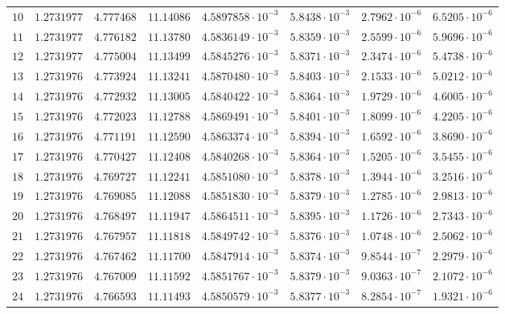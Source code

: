 {\begin{longtable}{@{}rrrrrrrr@{}}
$10$ & $1.2731977$ & $4.777468$ & $11.14086$ & $4.5897858\cdot10^{-3}$ & $5.8438\cdot10^{-3}$ & $2.7962\cdot10^{-6}$ & $6.5205\cdot10^{-6}$\\
$11$ & $1.2731977$ & $4.776182$ & $11.13780$ & $4.5836149\cdot10^{-3}$ & $5.8359\cdot10^{-3}$ & $2.5599\cdot10^{-6}$ & $5.9696\cdot10^{-6}$\\
$12$ & $1.2731977$ & $4.775004$ & $11.13499$ & $4.5845276\cdot10^{-3}$ & $5.8371\cdot10^{-3}$ & $2.3474\cdot10^{-6}$ & $5.4738\cdot10^{-6}$\\
$13$ & $1.2731976$ & $4.773924$ & $11.13241$ & $4.5870480\cdot10^{-3}$ & $5.8403\cdot10^{-3}$ & $2.1533\cdot10^{-6}$ & $5.0212\cdot10^{-6}$\\
$14$ & $1.2731976$ & $4.772932$ & $11.13005$ & $4.5840422\cdot10^{-3}$ & $5.8364\cdot10^{-3}$ & $1.9729\cdot10^{-6}$ & $4.6005\cdot10^{-6}$\\
$15$ & $1.2731976$ & $4.772023$ & $11.12788$ & $4.5869491\cdot10^{-3}$ & $5.8401\cdot10^{-3}$ & $1.8099\cdot10^{-6}$ & $4.2205\cdot10^{-6}$\\
$16$ & $1.2731976$ & $4.771191$ & $11.12590$ & $4.5863374\cdot10^{-3}$ & $5.8394\cdot10^{-3}$ & $1.6592\cdot10^{-6}$ & $3.8690\cdot10^{-6}$\\
$17$ & $1.2731976$ & $4.770427$ & $11.12408$ & $4.5840268\cdot10^{-3}$ & $5.8364\cdot10^{-3}$ & $1.5205\cdot10^{-6}$ & $3.5455\cdot10^{-6}$\\
$18$ & $1.2731976$ & $4.769727$ & $11.12241$ & $4.5851080\cdot10^{-3}$ & $5.8378\cdot10^{-3}$ & $1.3944\cdot10^{-6}$ & $3.2516\cdot10^{-6}$\\
$19$ & $1.2731976$ & $4.769085$ & $11.12088$ & $4.5851830\cdot10^{-3}$ & $5.8379\cdot10^{-3}$ & $1.2785\cdot10^{-6}$ & $2.9813\cdot10^{-6}$\\
$20$ & $1.2731976$ & $4.768497$ & $11.11947$ & $4.5864511\cdot10^{-3}$ & $5.8395\cdot10^{-3}$ & $1.1726\cdot10^{-6}$ & $2.7343\cdot10^{-6}$\\
$21$ & $1.2731976$ & $4.767957$ & $11.11818$ & $4.5849742\cdot10^{-3}$ & $5.8376\cdot10^{-3}$ & $1.0748\cdot10^{-6}$ & $2.5062\cdot10^{-6}$\\
$22$ & $1.2731976$ & $4.767462$ & $11.11700$ & $4.5847914\cdot10^{-3}$ & $5.8374\cdot10^{-3}$ & $9.8544\cdot10^{-7}$ & $2.2979\cdot10^{-6}$\\
$23$ & $1.2731976$ & $4.767009$ & $11.11592$ & $4.5851767\cdot10^{-3}$ & $5.8379\cdot10^{-3}$ & $9.0363\cdot10^{-7}$ & $2.1072\cdot10^{-6}$\\
$24$ & $1.2731976$ & $4.766593$ & $11.11493$ & $4.5850579\cdot10^{-3}$ & $5.8377\cdot10^{-3}$ & $8.2854\cdot10^{-7}$ & $1.9321\cdot10^{-6}$\\

\end{longtable}}
